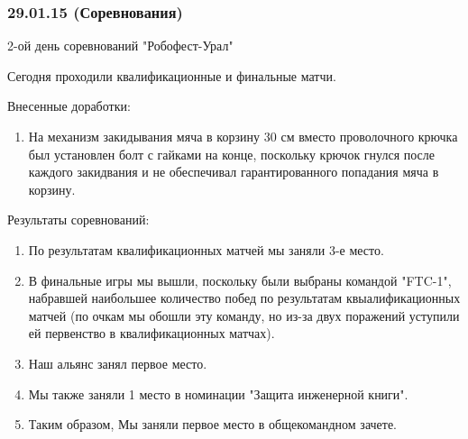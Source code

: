 \subsubsection{29.01.15 (Соревнования)}
\begin{center}
	2-ой день соревнований "Робофест-Урал"
\end{center}
Сегодня проходили квалификационные и финальные матчи.
\newline 

Внесенные доработки:
\begin{enumerate}
	\item На механизм закидывания мяча в корзину 30 см вместо проволочного крючка был установлен болт с гайками на конце, поскольку крючок гнулся после каждого закидвания и не обеспечивал гарантированного попадания мяча в корзину.
	
\end{enumerate}

Результаты соревнований:
\begin{enumerate}
	\item По результатам квалификационных матчей мы заняли 3-е место.
	
	\item В финальные игры мы вышли, поскольку были выбраны командой "FTC-1", набравшей наибольшее количество побед по результатам квыалификационных матчей (по очкам мы обошли эту команду, но из-за двух поражений уступили ей первенство в квалификационных матчах).
	
	\item Наш альянс занял первое место.
	
	\item Мы также заняли 1 место в номинации "Защита инженерной книги".
	
	\item Таким образом, Мы заняли первое место в общекомандном зачете.
\end{enumerate}

